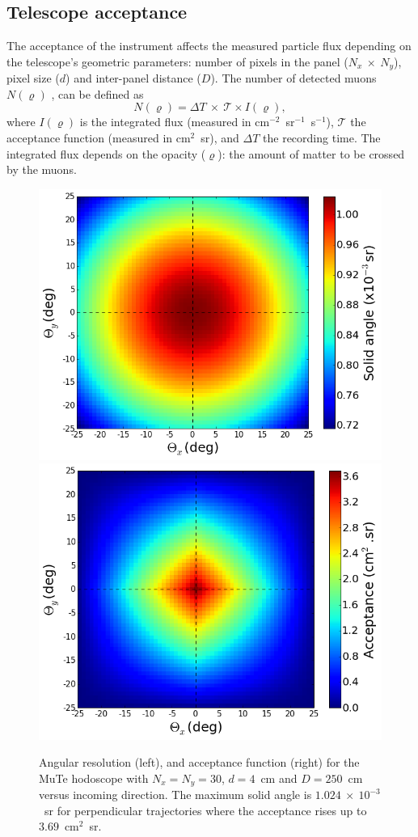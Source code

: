 \documentclass[letterpaper,11pt]{article}
\begin{document}
\subsection{Telescope acceptance}
The acceptance of the instrument affects the measured particle flux depending on the telescope's geometric parameters: number of pixels in the panel ($N_x~\times~N_y$), pixel size ($d$) and inter-panel distance ($D$). The number of detected muons $N(\varrho)$ \cite{LesparreEtal2010}, can be defined as
\begin{equation}
N(\varrho)=\Delta T~\times~\mathcal{T}\times I(\varrho), \label{Nmuons}
\end{equation}
where $I(\varrho)$ is the integrated flux (measured in cm$^{-2}$~sr$^{-1}$~s$^{-1}$), $\mathcal{T}$ the acceptance function (measured in cm$^{2}$~sr), and $\Delta T$ the recording time. The integrated flux depends on the opacity ($\varrho$): the amount of matter to be crossed by the muons.

\begin{figure}[htb]
\centering
\includegraphics[width=0.48\columnwidth]{Figures/Solid_angle.png}
\includegraphics[width=0.48\columnwidth]{Figures/Aceptancia.png}
\caption{Angular resolution (left), and acceptance function (right) for the MuTe hodoscope with $N_x=N_y=30$, $d=4$~cm and $D=250$~cm versus incoming direction. The maximum solid angle is $1.024~\times~10^{-3}$~sr for perpendicular trajectories where the acceptance rises up to $3.69$~cm$^{2}$~sr.}
\label{fig:acceptance}
\end{figure}
\end{document}
